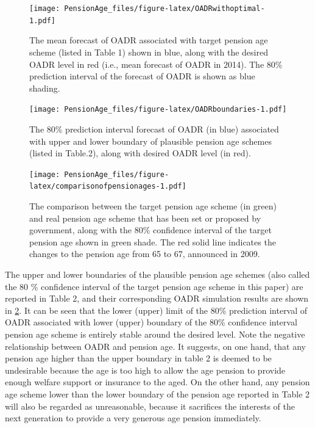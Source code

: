 \documentclass[11pt,a4paper,]{article}
\begin{document}
\begin{figure}
\centering
\texttt{[image: PensionAge\_files/figure-latex/OADRwithoptimal-1.pdf]}
\caption{\label{fig:OADRwithoptimal}The mean forecast of OADR associated
with target pension age scheme (listed in Table 1) shown in blue, along
with the desired OADR level in red (i.e., mean forecast of OADR in
2014). The 80\% prediction interval of the forecast of OADR is shown as
blue shading.}
\end{figure}

\begin{figure}
\centering
\texttt{[image: PensionAge\_files/figure-latex/OADRboundaries-1.pdf]}
\caption{\label{fig:OADRboundaries}The 80\% prediction interval forecast of
OADR (in blue) associated with upper and lower boundary of plausible
pension age schemes (listed in Table.2), along with desired OADR level
(in red).}
\end{figure}

\begin{figure}
\centering
\texttt{[image: PensionAge\_files/figure-latex/comparisonofpensionages-1.pdf]}
\caption{\label{fig:comparisonofpensionages}The comparison between the
target pension age scheme (in green) and real pension age scheme that
has been set or proposed by government, along with the 80\% confidence
interval of the target pension age shown in green shade. The red solid
line indicates the changes to the pension age from 65 to 67, announced
in 2009.}
\end{figure}

The upper and lower boundaries of the plausible pension age schemes
(also called the 80 \% confidence interval of the target pension age
scheme in this paper) are reported in Table 2, and their corresponding
OADR simulation results are shown in \ref{fig:OADRboundaries}. It can be
seen that the lower (upper) limit of the 80\% prediction interval of
OADR associated with lower (upper) boundary of the 80\% confidence
interval pension age scheme is entirely stable around the desired level.
Note the negative relationship between OADR and pension age. It
suggests, on one hand, that any pension age higher than the upper
boundary in table 2 is deemed to be undesirable because the age is too
high to allow the age pension to provide enough welfare support or
insurance to the aged. On the other hand, any pension age scheme lower
than the lower boundary of the pension age reported in Table 2 will also
be regarded as unreasonable, because it sacrifices the interests of the
next generation to provide a very generous age pension immediately.
\end{document}
